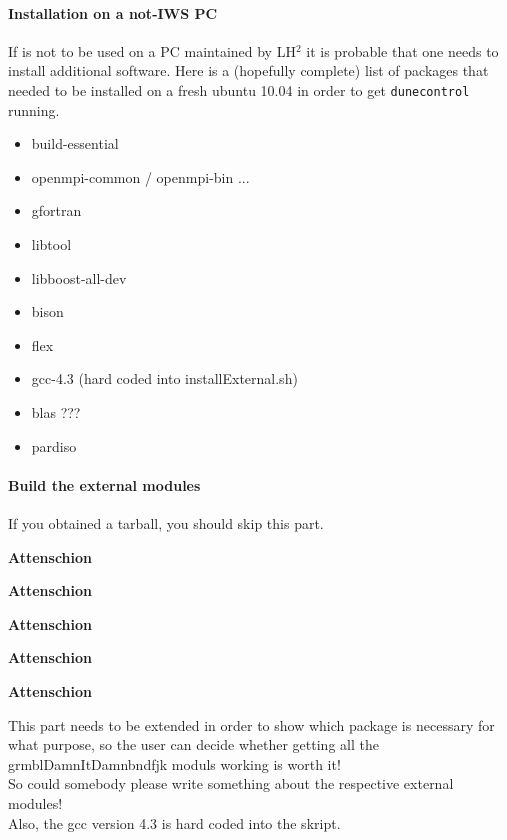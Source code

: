 \paragraph{Installation on a not-IWS PC}
If \Dumux is not to be used on a PC maintained by LH$^2$ it is probable that one needs to install additional software. 
Here is a (hopefully complete) list of packages that needed to  be installed on a fresh ubuntu 10.04 in order to get \verb+dunecontrol+ running.
\begin{itemize}
  \item build-essential
  \item openmpi-common / openmpi-bin ...
  \item gfortran
  \item libtool
  \item libboost-all-dev
  \item bison
  \item flex
  \item gcc-4.3 (hard coded into installExternal.sh)
  \item blas ???
  \item pardiso
\end{itemize}


\paragraph{Build the external modules} 
If you obtained a \Dumux tarball, you should skip this part. 

\begin{turn}{45}\textbf{Attenschion}\end{turn}
\begin{turn}{45}\textbf{Attenschion}\end{turn}
\begin{turn}{45}\textbf{Attenschion}\end{turn}
\begin{turn}{45}\textbf{Attenschion}\end{turn}
\begin{turn}{45}\textbf{Attenschion}\end{turn}

{\it

  This  part needs to be extended in order to show which package is necessary for what purpose, 
  so the user can decide whether getting all the grmblDamnItDamnbndfjk 
  moduls working is worth it! \\

  So could somebody please write something about the respective external modules!\\ 

Also, the gcc version 4.3 is hard coded into the skript. }

